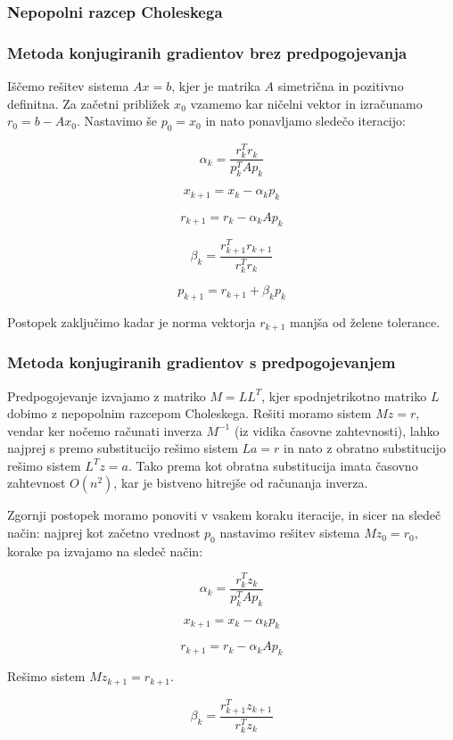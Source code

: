 \documentclass[12pt,a4paper]{article}
\begin{document}
\subsubsection{Nepopolni razcep Choleskega}

\subsubsection{Metoda konjugiranih gradientov brez predpogojevanja}
Iščemo rešitev sistema $Ax=b$, kjer je matrika $A$ simetrična in pozitivno definitna. Za začetni približek $x_0$ vzamemo kar ničelni vektor in izračunamo $r_0 = b - Ax_0$. Nastavimo še $p_0=x_0$ in nato ponavljamo sledečo iteracijo:


\[
\alpha_k=\frac{r_k^Tr_k}{p_k^TAp_k}
\]

\[
x_{k+1}=x_k-\alpha_kp_k
\]

\[
r_{k+1}=r_k-\alpha_kAp_k
\]

\[
\beta_k=\frac{r_{k+1}^Tr_{k+1}}{r_k^Tr_k}
\]

\[
p_{k+1}=r_{k+1}+\beta_kp_k
\]

Postopek zaključimo kadar je norma vektorja $r_{k+1}$ manjša od želene tolerance.


\subsubsection{Metoda konjugiranih gradientov s predpogojevanjem}
Predpogojevanje izvajamo z matriko $M=LL^T$, kjer spodnjetrikotno matriko $L$ dobimo z nepopolnim razcepom Choleskega. Rešiti moramo sistem $Mz=r$, vendar ker nočemo računati inverza $M^{-1}$ (iz vidika časovne zahtevnosti), lahko najprej s premo substitucijo rešimo sistem $La=r$ in nato z obratno substitucijo rešimo sistem $L^Tz=a$.  Tako prema kot obratna substitucija imata časovno zahtevnost $O(n^2)$, kar je bistveno hitrejše od računanja inverza.


Zgornji postopek moramo ponoviti v vsakem koraku iteracije, in sicer na sledeč način: najprej kot začetno vrednost $p_0$ nastavimo rešitev sistema $Mz_0=r_0$, korake pa izvajamo na sledeč način:


\[
\alpha_k=\frac{r_k^Tz_k}{p_k^TAp_k}
\]

\[
x_{k+1}=x_k-\alpha_kp_k
\]

\[
r_{k+1}=r_k-\alpha_kAp_k
\]

Rešimo sistem $Mz_{k+1}=r_{k+1}$.


\[
\beta_k=\frac{r_{k+1}^Tz_{k+1}}{r_k^Tz_k}
\]
\end{document}
